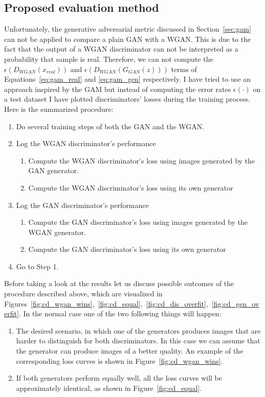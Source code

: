 \subsection{Proposed evaluation method}
Unfortunately, the generative adversarial metric discussed in Section~\ref{sec:gam} can not be applied to compare a plain GAN with a WGAN. This is due to the fact that the output of a WGAN discriminator can not be interpreted as a probability that sample is real. Therefore, we can not compute the $\epsilon(D_{WGAN}(x_{real}))$ and $\epsilon(D_{WGAN}(G_{GAN}(z)))$ terms of Equations~\ref{eq:gam_real} and \ref{eq:gam_gen} respectively. I have tried to use an approach inspired by the GAM but instead of computing the error rates $\epsilon(\cdot)$ on a test dataset I have plotted discriminators' losses during the training process. Here is the summarized procedure: 
\begin{enumerate}
	\item Do several training steps of both the GAN and the WGAN.
	\item Log the WGAN discriminator's performance 
		\begin{enumerate}
			\item Compute the WGAN discriminator's loss using images generated by the GAN generator.
			\item Compute the WGAN discriminator's loss using its own generator
		\end{enumerate}	
	\item Log the GAN discriminator's performance
		\begin{enumerate}
			\item Compute the GAN discriminator's loss using images generated by the WGAN generator.
			\item Compute the GAN discriminator's loss using its own generator
		\end{enumerate}
	\item Go to Step 1.
\end{enumerate}
Before taking a look at the results let us discuss possible outcomes of the procedure described above, which are visualized in Figures~\ref{fig:cd_wgan_wins},~\ref{fig:cd_equal},~\ref{fig:cd_dis_overfit},~\ref{fig:cd_gen_overfit}. 
In the normal case one of the two following things will happen:
\begin{enumerate}
	\item The desired scenario, in which one of the generators produces images that are harder to distinguish for both discriminators. In this case we can assume that the generator can produce images of a better quality. An example of the corresponding loss curves is shown in Figure~\ref{fig:cd_wgan_wins}.	
	\item If both generators perform equally well, all the loss curves will be approximately identical, as shown in Figure~\ref{fig:cd_equal}.
\end{enumerate}

